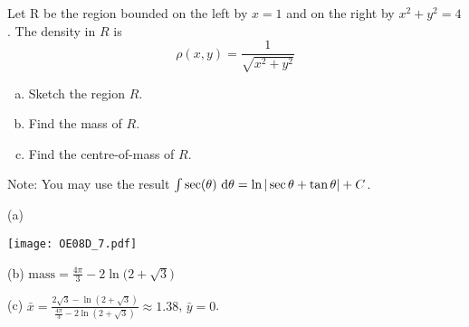 \begin{question}[M200 2008D] %
Let R be the region bounded on the left by $x = 1$ and on the right
by $x^2 + y^2 = 4$. The density in $R$ is
\begin{equation*}
\rho(x,y) =\frac{1}{\sqrt{x^2+y^2}}
\end{equation*} 
\begin{enumerate}[(a)]
\item
Sketch the region $R$.

\item
Find the mass of $R$.

\item
Find the centre-of-mass of $R$.

\end{enumerate}

Note: You may use the result $\int \sec(\theta)\ \mathrm{d}\theta 
= \ln |\sec \theta + \tan \theta| + C$.
\end{question}

%

\begin{answer}
(a)
\begin{center}
     \texttt{[image: OE08D\_7.pdf]}
\end{center}
(b) $\text{mass} = \frac{4\pi}{3} - 2\ln\big(2+\sqrt{3}\big)$

(c)
$\bar x = \frac{2\sqrt{3}- \ln(2+\sqrt{3})}
            {\frac{4\pi}{3} - 2\ln(2+\sqrt{3})}
        \approx 1.38$,
$\bar y=0$.
\end{answer}

